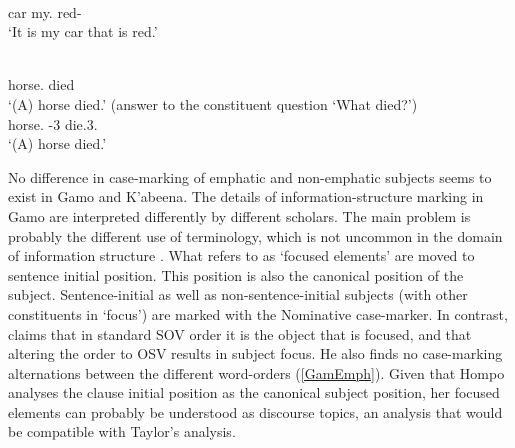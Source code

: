 \begin{exe} \ex\label{HarEmph}
\gll{}  \\
car my.\foc{} red-\fem{}\\
\glt `It is my car that is red.' \end{exe} 

\begin{exe}\ex\label{ArbEmph}
\begin{xlist}\ex\gll {} \\
horse.\pred{} died\\
\glt `(A) horse died.' (answer to the constituent question `What died?')
\ex\gll {}  \\
horse.\nom{} \pvs{}-3\sg{} die.3\sg{}.\fem{}\\
\glt `(A) horse died.'
\end{xlist} 
\end{exe}

No difference in case-marking of emphatic and non-emphatic subjects seems to exist in Gamo and K'abeena. 
The details of information-structure marking in Gamo are interpreted differently by different scholars. 
The main problem is probably the different use of terminology, which is not uncommon in the domain of information structure \citep[262]{Payne:1997}.
What \citet[359--360]{Hompo:1990} refers to as `focused elements' are moved to sentence initial position. 
This position is also the canonical position of the subject. 
Sentence-initial as well as non-sentence-initial subjects (with other constituents in `focus') are marked with the Nominative case-marker.
In contrast, \citet[222]{Taylor:1994} claims that in standard SOV order it is the object that is focused, and that altering the order to OSV results in subject focus. 
He also finds no case-marking alternations between the different word-orders (\ref{GamEmph}). 
Given that Hompo analyses the clause initial position as the canonical subject position, her focused elements can probably be understood as discourse topics, an analysis that would be compatible with Taylor's analysis.   %


